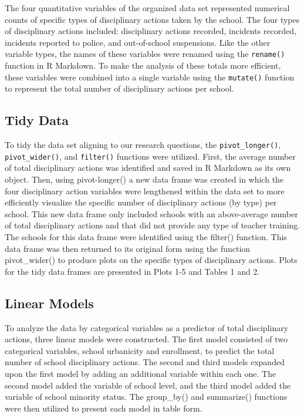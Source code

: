 \documentclass[
  man, fleqn, noextraspace]{apa6}
\begin{document}
The four quantitative variables of the organized data set represented numerical counts of specific types of disciplinary actions taken by the school. The four types of disciplinary actions included: disciplinary actions recorded, incidents recorded, incidents reported to police, and out-of-school suspensions. Like the other variable types, the names of these variables were renamed using the \texttt{rename()} function in R Markdown. To make the analysis of these totals more efficient, these variables were combined into a single variable using the \texttt{mutate()} function to represent the total number of disciplinary actions per school.

\hypertarget{tidy-data}{%
\subsection{Tidy Data}\label{tidy-data}}

To tidy the data set aligning to our research questions, the \texttt{pivot\_longer()}, \texttt{pivot\_wider()}, and \texttt{filter()} functions were utilized. First, the average number of total disciplinary actions was identified and saved in R Markdown as its own object. Then, using pivot-longer() a new data frame was created in which the four disciplinary action variables were lengthened within the data set to more efficiently visualize the specific number of disciplinary actions (by type) per school. This new data frame only included schools with an above-average number of total disciplinary actions and that did not provide any type of teacher training. The schools for this data frame were identified using the filter() function. This data frame was then returned to its original form using the function pivot\_wider() to produce plots on the specific types of disciplinary actions. Plots for the tidy data frames are presented in Plots 1-5 and Tables 1 and 2.

\hypertarget{linear-models}{%
\subsection{Linear Models}\label{linear-models}}

To analyze the data by categorical variables as a predictor of total disciplinary actions, three linear models were constructed. The first model consisted of two categorical variables, school urbanicity and enrollment, to predict the total number of school disciplinary actions. The second and third models expanded upon the first model by adding an additional variable within each one. The second model added the variable of school level, and the third model added the variable of school minority status. The group\_by() and summarize() functions were then utilized to present each model in table form.
\end{document}
